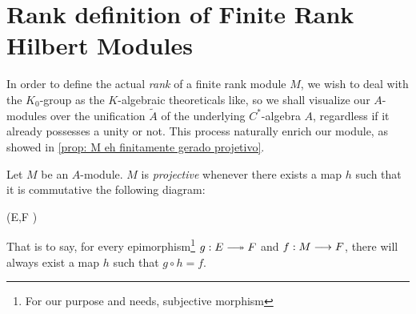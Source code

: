 \section{Rank definition of Finite Rank Hilbert Modules}
In order to define the actual \textit{rank} of a finite rank module $M$, we wish to deal with the $K_0$-group as the $K$-algebraic theoreticals like, so we shall visualize our $A$-modules over the unification $\widetilde A$ of the underlying $C^*$-algebra $A$, regardless if it already possesses a unity or not. This process naturally enrich our module, as showed in \ref{prop: M eh finitamente gerado projetivo}.

\begin{definicao}
Let $M$ be an $A$-module. $M$ is \textit{projective} whenever there exists a map $h$ such that it is commutative the following diagram:
\begin{eqspaced*}{(E,F \in {})}
\end{eqspaced*}
That is to say, for every epimorphism\footnote{For our purpose and needs, subjective morphism} $g: E \longtwoheadrightarrow F$ and $f:M \longrightarrow F$, there will always exist a map $h$ such that $g\circ h = f$.
\end{definicao}

